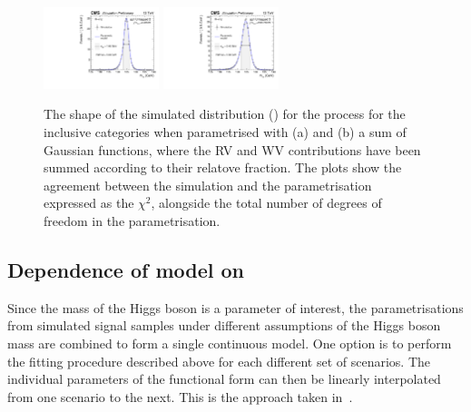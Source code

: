 \begin{figure}[ht!]
{{\includegraphics[width=0.3\textwidth]{modellingFigures/nGaus/ggh_UntaggedTag_2.pdf} 
\includegraphics[width=0.3\textwidth]{modellingFigures/nGaus/ggh_UntaggedTag_3.pdf} 
}}
\caption{The shape of the simulated \mgg distribution (\GeV) for the \ggH process for the inclusive categories when parametrised with (a) \DCBpG and (b) a sum of Gaussian functions, where the RV and WV contributions have been summed according to their relatove fraction. The plots show the agreement between the simulation and the parametrisation expressed as the $\chi^2$, alongside the total number of degrees of freedom in the parametrisation.}

\label{fig:model:functionalform}
\end{figure}


\subsection{Dependence of model on \mH}

Since the mass of the Higgs boson is a parameter of interest, the parametrisations from simulated signal samples under different assumptions of the Higgs boson mass are combined to form a single continuous model.  
One option is to perform the fitting procedure described above for each different set of \mH scenarios. The individual parameters of the functional form can then be linearly interpolated from one \mH scenario to the next. This is the approach taken in~\cite{}.

